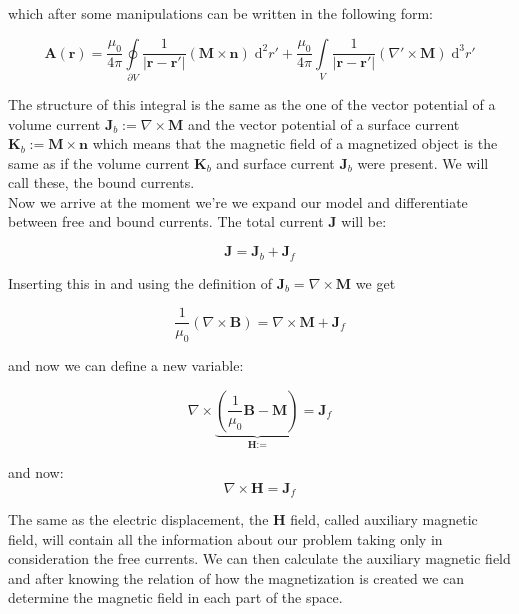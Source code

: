 which after some manipulations can be written in the following form:

\begin{equation}
 \textbf{A}(\textbf{r}) = \frac{\mu_0}{4\pi} \oint\limits_{\partial V} \frac{1}{|\textbf{r}-\textbf{r}'|}(\textbf{M}\times \textbf{n})\;\mathrm{d}^2r' + \frac{\mu_0}{4\pi} \int\limits_V \frac{1}{|\textbf{r}-\textbf{r}'|}(\nabla'\times\textbf{M})\;\mathrm{d}^3r'
\end{equation} 

The structure of this integral is the same as the one of the vector potential of a volume current $\textbf{J}_b :=\nabla \times \textbf{M}$ and the vector potential of a surface current $\textbf{K}_b := \textbf{M} \times \textbf{n}$ which means that the magnetic field of a magnetized object is the same as if the volume current $\textbf{K}_b$ and surface current $\textbf{J}_b$ were present. We will call these, the bound currents.\\

Now we arrive at the moment we're we expand our model and differentiate between free and bound currents. The total current $\textbf{J}$ will be:

\begin{equation}
\textbf{J} = \textbf{J}_b + \textbf{J}_f
\end{equation}

Inserting this in \label{eq:mx4st} and using the definition of $\textbf{J}_b = \nabla \times \textbf{M}$ we get

\begin{equation}
\frac{1}{\mu_0}(\nabla\times\textbf{B}) = \nabla \times \textbf{M} + \textbf{J}_f 
\end{equation}

and now we can define a new variable:

\begin{equation}\label{eq:defH}
\nabla\times\underbrace{(\frac{1}{\mu_0}\textbf{B}-\textbf{M})}_{\textbf{H}:=} =  \textbf{J}_f 
\end{equation}

and now:
\begin{equation}\label{eq:curlH}
\nabla\times\textbf{H}=  \textbf{J}_f 
\end{equation}

The same as the electric displacement, the $\textbf{H}$ field, called auxiliary magnetic field, will contain all the information about our problem taking only in consideration the free currents. We can then calculate the auxiliary magnetic field and after knowing the relation of how the magnetization is created we can determine the magnetic field in each part of the space.\\

